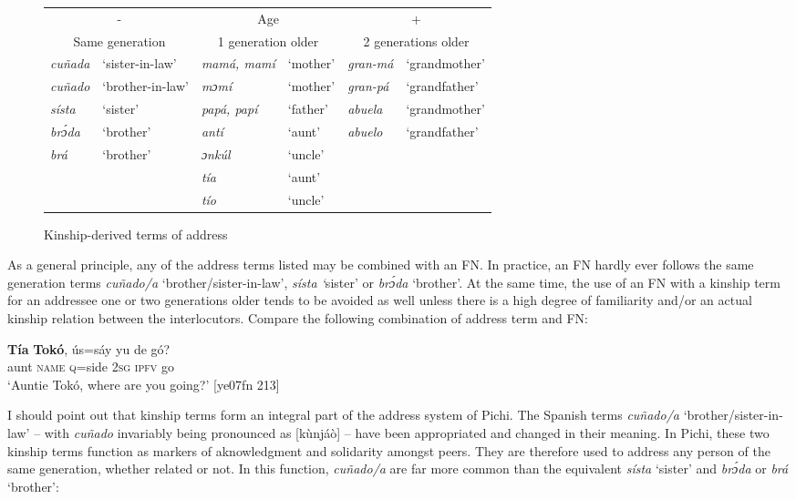 \begin{figure}
\caption{Kinship-derived terms of address}
\label{fig:key:12.2}
\small
\begin{tabularx}{\textwidth}{llllll}

\multicolumn{2}{c}{{}-} & \multicolumn{2}{c}{Age} & \multicolumn{2}{c}{+}\\
\multicolumn{2}{c}{Same generation} & \multicolumn{2}{c}{1 generation older} & \multicolumn{2}{c}{2 generations older}\\
\midrule 
\itshape cuñada & ‘sister-in-law’ & \itshape mamá, mamí & ‘mother’ & \itshape gran-má & ‘grandmother’\\
\itshape cuñado & ‘brother-in-law’ & \itshape mɔmí & ‘mother’ & \itshape gran-pá & ‘grandfather’\\
\itshape sísta & ‘sister’ & \itshape papá, papí & ‘father’ & \itshape abuela & ‘grandmother’\\
\itshape brɔ́da & ‘brother’ & \itshape antí & ‘aunt’ & \itshape abuelo & ‘grandfather’\\
\itshape brá & ‘brother’ & \itshape ɔnkúl & ‘uncle’ &  & \\
&  & \itshape tía & ‘aunt’ &  & \\
&  & \itshape tío & ‘uncle’ &  & \\
\end{tabularx}
\end{figure}
As a general principle, any of the address terms listed may be combined with an FN. In practice, an FN hardly ever follows the same generation terms \textit{cuñado}\textit{\textup{/}}\textit{a} ‘brother/sister-in-law’, \textit{sísta ‘}sister’ or \textit{brɔ́da} ‘brother’. At the same time, the use of an FN with a kinship term for an addressee one or two generations older tends to be avoided as well unless there is a high degree of familiarity and/or an actual kinship relation between the interlocutors. Compare the following combination of address term and FN:


\ea%
    \label{ex:key:1677}
    \gll \textbf{Tía}    \textbf{Tokó},  ús=sáy  yu  de  gó?\\
aunt    \textsc{name}  \textsc{q}=side  \textsc{2sg}  \textsc{ipfv}  go\\

\glt ‘Auntie Tokó, where are you going?’ [ye07fn 213]
\z

I should point out that  kinship terms form an integral part of the address system of Pichi. The Spanish terms \textit{cuñado}\textit{\textup{/}}\textit{a} ‘brother/sister-in-law’ – with \textit{cuñado} invariably being pronounced as [kùnjáò] – have been appropriated and changed in their meaning. In Pichi, these two kinship terms function as markers of aknowledgment and solidarity amongst peers. They are therefore used to address any person of the same generation, whether related or not. In this function, \textit{cuñado}\textit{\textup{/}}\textit{a} are far more common than the equivalent \textit{sísta} ‘sister’ and \textit{brɔ́da} or \textit{brá} ‘brother’: 


